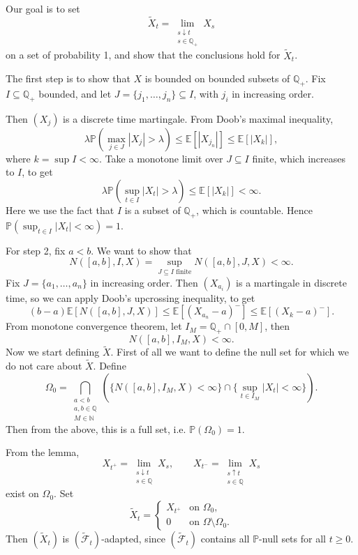 \documentclass[12pt]{article}
\begin{document}
\begin{proofbox}
	Our goal is to set
	\[
		\tilde X_t = \lim_{\substack{s \downarrow t \\ s \in \mathbb{Q}_+}} X_s
	\]
	on a set of probability 1, and show that the conclusions hold for $\tilde X_t$.

	The first step is to show that $X$ is bounded on bounded subsets of $\mathbb{Q}_+$. Fix $I \subseteq \mathbb{Q}_+$ bounded, and let $J = \{j_1, \ldots, j_n\} \subseteq I$, with $j_i$ in increasing order.

	Then $(X_j)$ is a discrete time martingale. From Doob's maximal inequality,
	\[
	\lambda \mathbb{P}(\max_{j \in J} |X_j| > \lambda) \leq \mathbb{E}[|X_{j_n}|]  \leq \mathbb{E}[|X_k|],
	\]
	where $k = \sup I < \infty$. Take a monotone limit over $J \subseteq I$ finite, which increases to $I$, to get
	\[
	\lambda \mathbb{P}(\sup_{t \in I} |X_t| > \lambda) \leq \mathbb{E}[|X_k|] < \infty.
	\]
	Here we use the fact that $I$ is a subset of $\mathbb{Q}_+$, which is countable. Hence $\mathbb{P}(\sup_{t \in I}|X_t| < \infty) = 1$.

	For step 2, fix $a < b$. We want to show that
	\[
		N([a, b], I, X) = \sup_{J \subseteq I \text{ finite}} N([a, b], J, X) < \infty.
	\]
	Fix $J = \{a_1, \ldots, a_n\}$ in increasing order. Then $(X_{a_i})$ is a martingale in discrete time, so we can apply Doob's upcrossing inequality, to get
	\[
		(b - a) \mathbb{E}[N([a, b], J, X)] \leq \mathbb{E}[(X_{a_n} - a)^{-}] \leq \mathbb{E}[(X_k - a)^{-}].
	\]
	From monotone convergence theorem, let $I_M = \mathbb{Q}_+ \cap [0, M]$, then
	\[
		N([a, b], I_M, X) < \infty.
	\]
	Now we start defining $\tilde X$. First of all we want to define the null set for which we do not care about $\tilde X$. Define
	\[
		\Omega_0 = \bigcap_{\substack{a < b \\ a, b \in \mathbb{Q} \\M \in \mathbb{N}}} (\{N([a, b], I_M, X) < \infty\} \cap \{\sup_{t \in I_M} |X_t| < \infty\}).
	\]
	Then from the above, this is a full set, i.e. $\mathbb{P}(\Omega_0) = 1$.

	From the lemma,
	\[
		X_{t^+} = \lim_{\substack{s \downarrow t \\ s \in \mathbb{Q}}} X_s, \qquad X_{t^{-}} = \lim_{\substack{s \uparrow t \\ s \in \mathbb{Q}}} X_s
	\]
	exist on $\Omega_0$. Set
	\[
	\tilde X_t = 
	\begin{cases}
		X_{t^+} &\text{on } \Omega_0, \\
		0 &\text{on } \Omega \setminus \Omega_0.
	\end{cases}
	\]
	Then $(\tilde X_t)$ is $(\tilde{\mathcal{F}}_t)$-adapted, since $(\tilde{\mathcal{F}}_t)$ contains all $\mathbb{P}$-null sets for all $t \geq 0$.


\end{proofbox}
\end{document}
